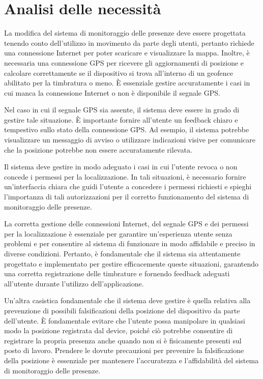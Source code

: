 \section{Analisi delle necessità}
La modifica del sistema di monitoraggio delle presenze deve essere progettata tenendo conto dell'utilizzo in movimento da parte degli utenti, pertanto richiede una connessione Internet per poter scaricare e visualizzare la mappa. Inoltre, è necessaria una connessione GPS per ricevere gli aggiornamenti di posizione e calcolare correttamente se il dispositivo si trova all'interno di un geofence abilitato per la timbratura o meno. È essenziale gestire accuratamente i casi in cui manca la connessione Internet o non è disponibile il segnale GPS.

Nel caso in cui il segnale GPS sia assente, il sistema deve essere in grado di gestire tale situazione. È importante fornire all'utente un feedback chiaro e tempestivo sullo stato della connessione GPS. Ad esempio, il sistema potrebbe visualizzare un messaggio di avviso o utilizzare indicazioni visive per comunicare che la posizione potrebbe non essere accuratamente rilevata.

Il sistema deve gestire in modo adeguato i casi in cui l'utente revoca o non concede i permessi per la localizzazione. In tali situazioni, è necessario fornire un'interfaccia chiara che guidi l'utente a concedere i permessi richiesti e spieghi l'importanza di tali autorizzazioni per il corretto funzionamento del sistema di monitoraggio delle presenze.

La corretta gestione delle connessioni Internet, del segnale GPS e dei permessi per la localizzazione è essenziale per garantire un'esperienza utente senza problemi e per consentire al sistema di funzionare in modo affidabile e preciso in diverse condizioni. Pertanto, è fondamentale che il sistema sia attentamente progettato e implementato per gestire efficacemente queste situazioni, garantendo una corretta registrazione delle timbrature e fornendo feedback adeguati all'utente durante l'utilizzo dell'applicazione.

Un'altra casistica fondamentale che il sistema deve gestire è quella relativa alla prevenzione di possibili falsificazioni della posizione del dispositivo da parte dell'utente. È fondamentale evitare che l'utente possa manipolare in qualsiasi modo la posizione registrata dal device, poiché ciò potrebbe consentire di registrare la propria presenza anche quando non si è fisicamente presenti sul posto di lavoro.
Prendere le dovute precauzioni per prevenire la falsificazione della posizione è essenziale per mantenere l'accuratezza e l'affidabilità del sistema di monitoraggio delle presenze.